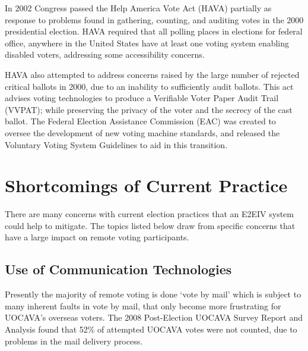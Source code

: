 In 2002 Congress passed the Help America Vote Act (HAVA) partially as response to problems found in gathering, counting, and auditing votes in the 2000 presidential election. HAVA required that all polling places in elections for federal office, anywhere in the United States have at least one voting system enabling disabled voters, addressing some accessibility concerns.

HAVA also attempted to address concerns raised by the large number of rejected critical ballots in 2000, due to an inability to sufficiently audit ballots. This act advises voting technologies to produce a Verifiable Voter Paper Audit Trail (VVPAT); while preserving the privacy of the voter and the secrecy of the cast ballot. The Federal Election Assistance Commission (EAC) was created to oversee the development of new voting machine standards, and released the Voluntary Voting System Guidelines to aid in this transition.




\section{Shortcomings of Current Practice}

There are many concerns with current election practices that an E2EIV system could help to mitigate. The topics listed below draw from specific concerns that have a large impact on remote voting participants.

\subsection{Use of Communication Technologies}
Presently the majority of remote voting is done `vote by mail'  which is subject to many inherent faults in vote by mail, that only become more frustrating for UOCAVA's overseas voters. The 2008 Post-Election UOCAVA Survey Report and Analysis found that 52\% of attempted UOCAVA votes were not counted, due to problems in the mail delivery process. %

